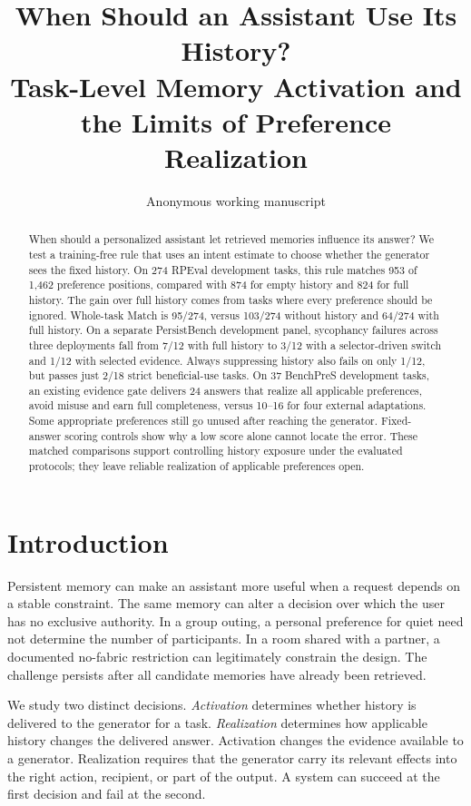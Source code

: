 \documentclass[11pt]{article}
\title{When Should an Assistant Use Its History?\\Task-Level Memory Activation and the Limits of Preference Realization}
\author{Anonymous working manuscript}
\begin{document}
\maketitle
\raggedbottom

\begin{abstract}
When should a personalized assistant let retrieved memories influence its answer? We test a training-free rule that uses an intent estimate to choose whether the generator sees the fixed history. On 274 RPEval development tasks, this rule matches 953 of 1,462 preference positions, compared with 874 for empty history and 824 for full history. The gain over full history comes from tasks where every preference should be ignored. Whole-task Match is 95/274, versus 103/274 without history and 64/274 with full history. On a separate PersistBench development panel, sycophancy failures across three deployments fall from 7/12 with full history to 3/12 with a selector-driven switch and 1/12 with selected evidence. Always suppressing history also fails on only 1/12, but passes just 2/18 strict beneficial-use tasks. On 37 BenchPreS development tasks, an existing evidence gate delivers 24 answers that realize all applicable preferences, avoid misuse and earn full completeness, versus 10--16 for four external adaptations. Some appropriate preferences still go unused after reaching the generator. Fixed-answer scoring controls show why a low score alone cannot locate the error. These matched comparisons support controlling history exposure under the evaluated protocols; they leave reliable realization of applicable preferences open.
\end{abstract}

\section{Introduction}

Persistent memory can make an assistant more useful when a request depends on a stable constraint. The same memory can alter a decision over which the user has no exclusive authority. In a group outing, a personal preference for quiet need not determine the number of participants. In a room shared with a partner, a documented no-fabric restriction can legitimately constrain the design. The challenge persists after all candidate memories have already been retrieved.

We study two distinct decisions. \emph{Activation} determines whether history is delivered to the generator for a task. \emph{Realization} determines how applicable history changes the delivered answer. Activation changes the evidence available to a generator. Realization requires that the generator carry its relevant effects into the right action, recipient, or part of the output. A system can succeed at the first decision and fail at the second.
\end{document}
